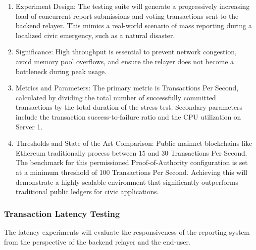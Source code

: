 \begin{enumerate}
    \item Experiment Design: The testing suite will generate a progressively increasing load of concurrent report submissions and voting transactions sent to the backend relayer. This mimics a real-world scenario of mass reporting during a localized civic emergency, such as a natural disaster.
    \item Significance: High throughput is essential to prevent network congestion, avoid memory pool overflows, and ensure the relayer does not become a bottleneck during peak usage.
    \item Metrics and Parameters: The primary metric is Transactions Per Second, calculated by dividing the total number of successfully committed transactions by the total duration of the stress test. Secondary parameters include the transaction success-to-failure ratio and the CPU utilization on Server 1.
    \item Thresholds and State-of-the-Art Comparison: Public mainnet blockchains like Ethereum traditionally process between 15 and 30 Transactions Per Second. The benchmark for this permissioned Proof-of-Authority configuration is set at a minimum threshold of 100 Transactions Per Second. Achieving this will demonstrate a highly scalable environment that significantly outperforms traditional public ledgers for civic applications.
\end{enumerate}

\subsubsection{Transaction Latency Testing}
The latency experiments will evaluate the responsiveness of the reporting system from the perspective of the backend relayer and the end-user.

